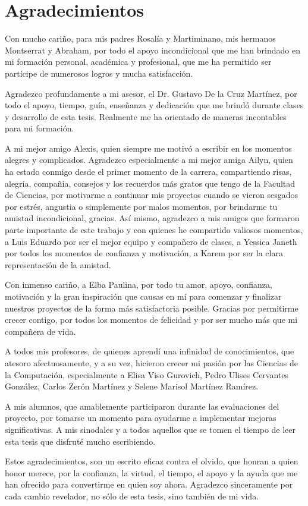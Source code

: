 \chapter*{Agradecimientos}

Con mucho cariño, para mis padres Rosalía y Martiminano, mis hermanos Montserrat y Abraham, por todo el apoyo incondicional que me han brindado en mi formación personal, académica y profesional, que me ha permitido ser partícipe de numerosos logros y mucha satisfacción.

Agradezco profundamente a mi asesor, el Dr. Gustavo De la Cruz Martínez, por todo el apoyo, tiempo, guía, enseñanza y dedicación que me brindó durante clases y desarrollo de esta tesis. Realmente me ha orientado de maneras incontables para mi formación.

A mi mejor amigo Alexis, quien siempre me motivó a escribir en los momentos alegres y complicados. Agradezco especialmente a mi mejor amiga Ailyn, quien ha estado conmigo desde el primer momento de la carrera, compartiendo risas, alegría, compañía, consejos y los recuerdos más gratos que tengo de la Facultad de Ciencias, por motivarme a continuar mis proyectos cuando se vieron sesgados por estrés, angustia o simplemente por malos momentos, por brindarme tu amistad incondicional, gracias. Así mismo, agradezco a mis amigos que formaron parte importante de este trabajo y con quienes he compartido valiosos momentos, a Luis Eduardo por ser el mejor equipo y compañero de clases, a Yessica Janeth por todos los momentos de confianza y motivación, a Karem por ser la clara representación de la amistad.

Con inmenso cariño, a Elba Paulina, por todo tu amor, apoyo, confianza, motivación y la gran inspiración que causas en mí para comenzar y finalizar nuestros proyectos de la forma más satisfactoria posible. Gracias por permitirme crecer contigo, por todos los momentos de felicidad y por ser mucho más que mi compañera de vida.

A todos mis profesores, de quienes aprendí una infinidad de conocimientos, que atesoro afectuosamente, y a su vez, hicieron crecer mi pasión por las Ciencias de la Computación, especialmente a Elisa Viso Gurovich, Pedro Ulises Cervantes González, Carlos Zerón Martínez y Selene Marisol Martínez Ramírez.

A mis alumnos, que amablemente participaron durante las evaluaciones del proyecto, por tomarse un momento para ayudarme a implementar mejoras significativas. A mis sinodales y a todos aquellos que se tomen el tiempo de leer esta tesis que disfruté mucho escribiendo.

Estos agradecimientos, son un escrito eficaz contra el olvido, que honran a quien honor merece, por la confianza, la virtud, el tiempo, el apoyo y la ayuda que me han ofrecido para convertirme en quien soy ahora. Agradezco sinceramente por cada cambio revelador, no sólo de esta tesis, sino también de mi vida.
